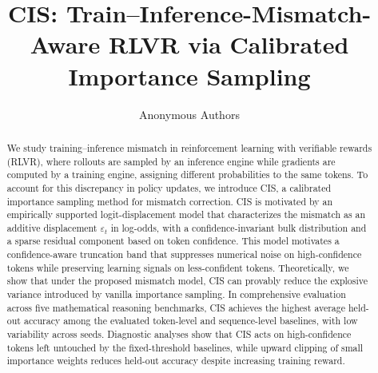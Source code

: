 \documentclass{article}
\title{CIS: Train–Inference-Mismatch-Aware RLVR via Calibrated Importance Sampling
}
\author{Anonymous Authors}
\newcommand{\1}{\mathbf{1}}
\begin{document}
\maketitle

\begin{abstract}
We study training–inference mismatch in reinforcement learning with verifiable rewards (RLVR), where rollouts are sampled by an inference engine while gradients are computed by a training engine, assigning different probabilities to the same tokens. To account for this discrepancy in policy updates, we introduce CIS, a calibrated importance sampling method for mismatch correction. CIS is motivated by an empirically supported logit-displacement model that characterizes the mismatch as an additive displacement $\varepsilon_t$ in log-odds, with a confidence-invariant bulk distribution and a sparse residual component based on token confidence. This model motivates a confidence-aware truncation band that suppresses numerical noise on high-confidence tokens while preserving learning signals on less-confident tokens. Theoretically, we show that under the proposed mismatch model, CIS can provably reduce the explosive variance introduced by vanilla importance sampling. In comprehensive evaluation across five mathematical reasoning benchmarks, CIS achieves the highest average held-out accuracy among the evaluated token-level and sequence-level baselines, with low variability across seeds. Diagnostic analyses show that CIS acts on high-confidence tokens left untouched by the fixed-threshold baselines, while upward clipping of small importance weights reduces held-out accuracy despite increasing training reward. 

\end{abstract}
\end{document}
